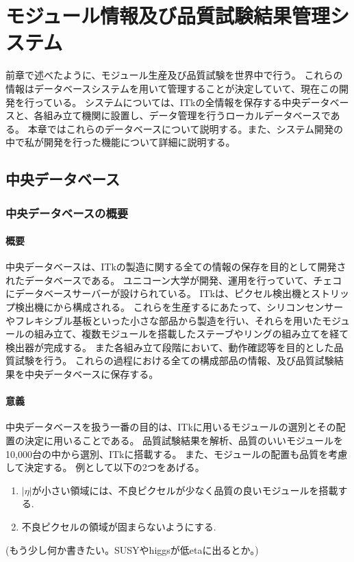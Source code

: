 \chapter{モジュール情報及び品質試験結果管理システム}\label{chap:dbsystem}
前章で述べたように、モジュール生産及び品質試験を世界中で行う。
これらの情報はデータベースシステムを用いて管理することが決定していて、現在この開発を行っている。
システムについては、ITkの全情報を保存する中央データベースと、各組み立て機関に設置し、データ管理を行うローカルデータベースである。
本章ではこれらのデータベースについて説明する。また、システム開発の中で私が開発を行った機能について詳細に説明する。

\section{中央データベース}
\subsection{中央データベースの概要}
\subsubsection{概要}
中央データベースは、ITkの製造に関する全ての情報の保存を目的として開発されたデータベースである。
ユニコーン大学が開発、運用を行っていて、チェコにデータベースサーバーが設けられている。
ITkは、ピクセル検出機とストリップ検出機にから構成される。
これらを生産するにあたって、シリコンセンサーやフレキシブル基板といった小さな部品から製造を行い、それらを用いたモジュールの組み立て、複数モジュールを搭載したステーブやリングの組み立てを経て検出器が完成する。
また各組み立て段階において、動作確認等を目的とした品質試験を行う。
これらの過程における全ての構成部品の情報、及び品質試験結果を中央データベースに保存する。

\subsubsection{意義}
中央データベースを扱う一番の目的は、ITkに用いるモジュールの選別とその配置の決定に用いることである。
品質試験結果を解析、品質のいいモジュールを10,000台の中から選別、ITkに搭載する。
また、モジュールの配置も品質を考慮して決定する。
例として以下の2つをあげる。
\begin{enumerate}
  \item $|\eta|$が小さい領域には、不良ピクセルが少なく品質の良いモジュールを搭載する.
  \item 不良ピクセルの領域が固まらないようにする.
\end{enumerate}
(もう少し何か書きたい。SUSYやhiggsが低etaに出るとか。)

